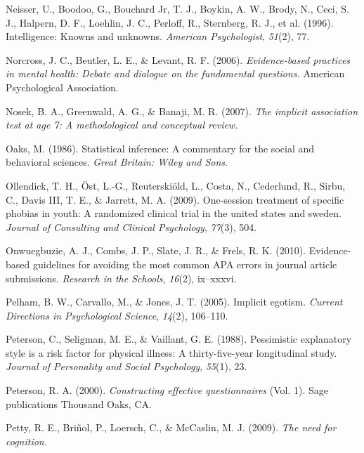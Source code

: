 \documentclass[
]{krantz}
\newlength{\cslhangindent}
\newenvironment{CSLReferences}[2] %
 {\begin{list}{}{%
  \setlength{\itemindent}{0pt}
  \setlength{\leftmargin}{0pt}
  \setlength{\parsep}{0pt}
  \ifodd #1
   \setlength{\leftmargin}{\cslhangindent}
   \setlength{\itemindent}{-1\cslhangindent}
  \fi
  \setlength{\itemsep}{#2\baselineskip}}}
 {\end{list}}
\begin{document}
\begin{CSLReferences}{1}{0}
Neisser, U., Boodoo, G., Bouchard Jr, T. J., Boykin, A. W., Brody, N., Ceci, S. J., Halpern, D. F., Loehlin, J. C., Perloff, R., Sternberg, R. J., et al. (1996). Intelligence: Knowns and unknowns. \emph{American Psychologist}, \emph{51}(2), 77.

Norcross, J. C., Beutler, L. E., \& Levant, R. F. (2006). \emph{Evidence-based practices in mental health: Debate and dialogue on the fundamental questions.} American Psychological Association.

Nosek, B. A., Greenwald, A. G., \& Banaji, M. R. (2007). \emph{The implicit association test at age 7: A methodological and conceptual review.}

Oaks, M. (1986). Statistical inference: A commentary for the social and behavioral sciences. \emph{Great Britain: Wiley and Sons}.

Ollendick, T. H., Öst, L.-G., Reuterskiöld, L., Costa, N., Cederlund, R., Sirbu, C., Davis III, T. E., \& Jarrett, M. A. (2009). One-session treatment of specific phobias in youth: A randomized clinical trial in the united states and sweden. \emph{Journal of Consulting and Clinical Psychology}, \emph{77}(3), 504.

Onwuegbuzie, A. J., Combs, J. P., Slate, J. R., \& Frels, R. K. (2010). Evidence-based guidelines for avoiding the most common APA errors in journal article submissions. \emph{Research in the Schools}, \emph{16}(2), ix--xxxvi.

Pelham, B. W., Carvallo, M., \& Jones, J. T. (2005). Implicit egotism. \emph{Current Directions in Psychological Science}, \emph{14}(2), 106--110.

Peterson, C., Seligman, M. E., \& Vaillant, G. E. (1988). Pessimistic explanatory style is a risk factor for physical illness: A thirty-five-year longitudinal study. \emph{Journal of Personality and Social Psychology}, \emph{55}(1), 23.

Peterson, R. A. (2000). \emph{Constructing effective questionnaires} (Vol. 1). Sage publications Thousand Oaks, CA.

Petty, R. E., Briñol, P., Loersch, C., \& McCaslin, M. J. (2009). \emph{The need for cognition.}


\end{CSLReferences}
\end{document}
